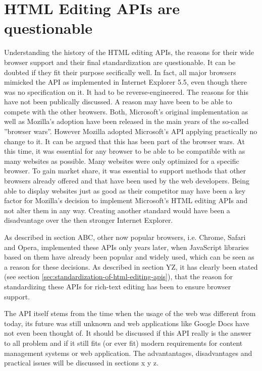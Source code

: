 \section{HTML Editing APIs are questionable}

Understanding the history of the HTML editing APIs, the reasons for their wide browser support and their final standardization are questionable. It can be doubted if they fit their purpose secifically well. In fact, all major browsers mimicked the API as implemented in Internet Explorer 5.5, even though there was no specification on it. It had to be reverse-engineered. The reasons for this have not been publically discussed. A reason may have been to be able to compete with the other browsers. Both, Microsoft's original implementation as well as Mozilla's adoption have been released in the main years of the so-called ''browser wars''. However Mozilla adopted Microsoft's API applying practically no change to it. It can be argued that this has been part of the browser wars. At this time, it was essential for any browser to be able to be compatible with as many websites as possible. Many websites were only optimized for a specific browser. To gain market share, it was essential to support methods that other browsers already offered and that have been used by the web developers. Being able to display websites just as good as their competitor may have been a key factor for Mozilla's decision to implement Microsoft's HTML editing APIs and not alter them in any way. Creating another standard would have been a disadvantage over the then stronger Internet Explorer. 

As described in section ABC, other now popular browsers, i.e. Chrome, Safari and Opera, implemented these APIs only years later, when JavaScript libraries based on them have already been popular and widely used, which can be seen as a reason for these decisions. As described in section YZ, it has clearly been stated (see section \ref{sec:standardization-of-html-editing-apis}), that the reason for standardizing these APIs for rich-text editing has been to ensure browser support.

The API itself stems from the time when the usage of the web was different from today, its future was still unknown and web applications like Google Docs have not even been thought of. It should be discussed if this API really is the answer to all problem and if it still fits (or ever fit) modern requirements for content management systems or web application. The advantantages, disadvantages and practical issues will be discussed in sections x y z.


